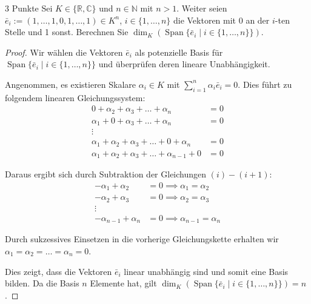 \documentclass{problemset}
\begin{document}
\begin{problem}{3 Punkte}
Sei $K \in \{ \mathbb{R}, \mathbb{C} \}$ und $n \in \mathbb{N}$ mit $n > 1$. Weiter seien $\bar{e}_i := (1, \ldots, 1, 0, 1, \ldots, 1) \in K^n$, $i \in \{1, \ldots, n\}$ die Vektoren mit 0 an der $i$-ten Stelle und 1 sonst. Berechnen Sie $\dim_K(\operatorname{Span}\{\bar{e}_i \mid i \in \{1, \ldots, n\}\})$.

\begin{proof}
    Wir wählen die Vektoren $\bar{e}_i$ als potenzielle Basis für $\operatorname{Span}\{\bar{e}_i \mid i \in \{1, \ldots, n\}\}$ und überprüfen deren lineare Unabhängigkeit.

    Angenommen, es existieren Skalare $\alpha_i \in K$ mit $\sum_{i=1}^{n} \alpha_i
        \bar{e}_i = 0$. Dies führt zu folgendem linearen Gleichungssystem:
    \begin{align}
        0 + \alpha_2 + \alpha_3 + \ldots + \alpha_n                & = 0             \\
        \alpha_1 + 0 + \alpha_3 + \ldots + \alpha_n                & = 0             \\
        \vdots                                                          \tag*{}      \\
        \alpha_1 + \alpha_2 + \alpha_3 + \ldots + 0 + \alpha_n     & = 0 \tag{n - 1} \\
        \alpha_1 + \alpha_2 + \alpha_3 + \ldots + \alpha_{n-1} + 0 & = 0 \tag{n}
    \end{align}

    Daraus ergibt sich durch Subtraktion der Gleichungen $(i)-(i+1)$:
    \begin{align*}
        -\alpha_1 + \alpha_2     & = 0 \implies \alpha_1 = \alpha_2     \\
        -\alpha_2 + \alpha_3     & = 0 \implies \alpha_2 = \alpha_3     \\
        \vdots                                                          \\
        -\alpha_{n-1} + \alpha_n & = 0 \implies \alpha_{n-1} = \alpha_n
    \end{align*}

    Durch sukzessives Einsetzen in die vorherige Gleichungskette erhalten wir
    $\alpha_1 = \alpha_2 = \ldots = \alpha_n = 0$.

    Dies zeigt, dass die Vektoren $\bar{e}_i$ linear unabhängig sind und somit eine
    Basis bilden. Da die Basis $n$ Elemente hat, gilt
    $\dim_K(\operatorname{Span}\{\bar{e}_i \mid i \in \{1, \ldots, n\}\}) = n$.
\end{proof}
\end{problem}
\end{document}

